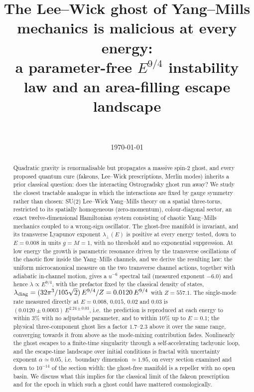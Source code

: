 \documentclass[11pt,a4paper]{article}
\title{The Lee--Wick ghost of Yang--Mills mechanics is malicious at every energy:\\
a parameter-free $E^{9/4}$ instability law and an area-filling escape landscape}
\author{\AuthorName\\ \small \texttt{\AuthorEmail}}
\date{\today}
\begin{document}
\maketitle

\begin{abstract}
Quadratic gravity is renormalisable but propagates a massive spin-2 ghost, and every proposed
quantum cure (fakeons, Lee--Wick prescriptions, Merlin modes) inherits a prior classical question:
does the interacting Ostrogradsky ghost run away? We study the closest tractable analogue in which
the interactions are fixed by gauge symmetry rather than chosen: SU(2) Lee--Wick Yang--Mills theory
on a spatial three-torus, restricted to its spatially homogeneous (zero-momentum), colour-diagonal
sector, an exact twelve-dimensional Hamiltonian system consisting of chaotic Yang--Mills mechanics coupled to a wrong-sign oscillator.
The ghost-free manifold is invariant, and its transverse Lyapunov exponent $\lambda_\perp(E)$ is
positive at every energy tested, down to $E=0.008$ in units $g=M=1$, with no threshold and no
exponential suppression. At low energy the growth is parametric resonance driven by the
transverse oscillations of the chaotic flow inside the Yang--Mills channels, and we derive the
resulting law: the uniform microcanonical measure on the two transverse channel actions, together
with adiabatic in-channel motion, gives a $u^{-6}$ spectral tail (measured exponent $-6.0$) and
hence $\lambda\propto E^{9/4}$, with the prefactor fixed by the classical density of states,
$\lambda_{\rm diag}=(32\pi^3/105\sqrt2)\,E^{9/4}/Z=0.0120\,E^{9/4}$ with $Z=557.1$. The
single-mode rate measured directly at $E=0.008$, $0.015$, $0.02$ and $0.03$ is
$(0.0120\pm0.0003)\,E^{2.24\pm0.03}$, i.e.\ the prediction is reproduced at each energy to
within $3\%$ with no adjustable parameter, and to within $10\%$ up to $E=0.1$; the physical three-component ghost lies a factor
$1.7$--$2.3$ above it over the same range, converging towards it from above as the mode-mixing
contribution fades. Nonlinearly the ghost escapes to a
finite-time singularity through a self-accelerating tachyonic loop, and the escape-time landscape
over initial conditions is fractal with uncertainty exponent $\alpha\simeq0.05$, i.e.\ boundary
dimension $\simeq1.95$, on every section examined and down to $10^{-14}$ of the section width:
the ghost-free manifold is a repeller with no open basin. We discuss what this implies for the
classical limit of the fakeon prescription and for the epoch in which such a ghost could have
mattered cosmologically.
\end{abstract}
\end{document}
